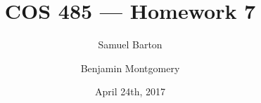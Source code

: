 \documentclass{article}
\title{COS 485 --- Homework 7}
\author{Samuel Barton \and Benjamin Montgomery}
\date{April 24th, 2017}
\begin{document}
\maketitle

\pagebreak

\pagebreak

\pagebreak


\end{document}
